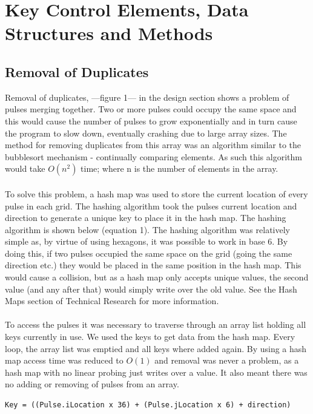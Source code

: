 \documentclass[10pt,a4paper]{article}
\begin{document}
\section{Key Control Elements, Data Structures and Methods}
\subsection{Removal of Duplicates}
Removal of duplicates, ---figure 1--- in the design section shows a problem of pulses merging together. Two or more pulses could occupy the same space and this would cause the number of pulses to grow exponentially and in turn cause the program to slow down, eventually crashing due to large array sizes. The method for removing duplicates from this array was an algorithm similar to the bubblesort mechanism - continually comparing elements. As such this algorithm would take $ O(n^{2}) $ time; where n is the number of elements in the array. \\
\\
To solve this problem, a hash map was used to store the current location of every pulse in each grid. The hashing algorithm took the pulses current location and direction to generate a unique key to place it in the hash map. The hashing algorithm is shown below (equation 1). The hashing algorithm was relatively simple as, by virtue of using hexagons, it was possible to work in base 6. By doing this, if two pulses occupied the same space on the grid (going the same direction etc.) they would be placed in the same position in the hash map. This would cause a collision, but as a hash map only accepts unique values, the second value (and any after that) would simply write over the old value. See the Hash Maps section of Technical Research for more information.\\
\\
To access the pulses it was necessary to traverse through an array list holding all keys currently in use. We used the keys to get data from the hash map. Every loop, the array list was emptied and all keys where added again. By using a hash map access time was reduced to $O(1)$ and removal was never a problem, as a hash map with no linear probing just writes over a value. It also meant there was no adding or removing of pulses from an array.\\
\begin{verbatim}
Key = ((Pulse.iLocation x 36) + (Pulse.jLocation x 6) + direction)
\end{verbatim}
\end{document}
